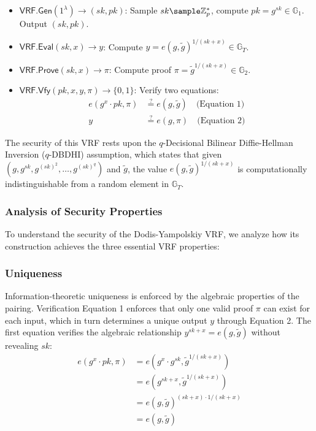\begin{itemize}
    \item $\mathsf{VRF.Gen}(1^\lambda) \to (sk, pk)$: Sample $sk \sample \mathbb{Z}_p^*$, compute $pk = g^{sk} \in \mathbb{G}_1$. Output $(sk, pk)$.
    
    \item $\mathsf{VRF.Eval}(sk, x) \to y$: Compute $y = e(g, \tilde{g})^{1/(sk + x)} \in \mathbb{G}_T$.
    
    \item $\mathsf{VRF.Prove}(sk, x) \to \pi$: Compute proof $\pi = \tilde{g}^{1/(sk + x)} \in \mathbb{G}_2$.
    
    \item $\mathsf{VRF.Vfy}(pk, x, y, \pi) \to \{0, 1\}$: Verify two equations:
    \begin{align}
        e(g^{x} \cdot pk, \pi) &\stackrel{?}{=} e(g, \tilde{g}) \quad \text{(Equation 1)}\\
        y &\stackrel{?}{=} e(g, \pi) \quad \text{(Equation 2)}
    \end{align}
\end{itemize}

The security of this VRF rests upon the $q$-Decisional Bilinear Diffie-Hellman Inversion ($q$-DBDHI) assumption, which states that given $(g, g^{sk}, g^{(sk)^2}, \ldots, g^{(sk)^q})$ and $\tilde{g}$, the value $e(g, \tilde{g})^{1/(sk+x)}$ is computationally indistinguishable from a random element in $\mathbb{G}_T$.

\subsubsection{Analysis of Security Properties}

To understand the security of the Dodis-Yampolskiy VRF, we analyze how its construction achieves the three essential VRF properties:

\subsubsection*{Uniqueness}
Information-theoretic uniqueness is enforced by the algebraic properties of the pairing. 
Verification Equation 1 enforces that only one valid proof $\pi$ can exist for each input, which in turn determines a unique output $y$ through Equation 2. The first equation verifies the algebraic relationship $y^{sk+x} = e(g, \tilde{g})$ without revealing $sk$:
\begin{align}
    e(g^{x} \cdot pk, \pi) &= e(g^{x} \cdot g^{sk}, \tilde{g}^{1/(sk + x)}) \\
    &= e(g^{sk + x}, \tilde{g}^{1/(sk + x)}) \\
    &= e(g, \tilde{g})^{(sk + x) \cdot 1/(sk + x)} \\
    &= e(g, \tilde{g})
\end{align}

